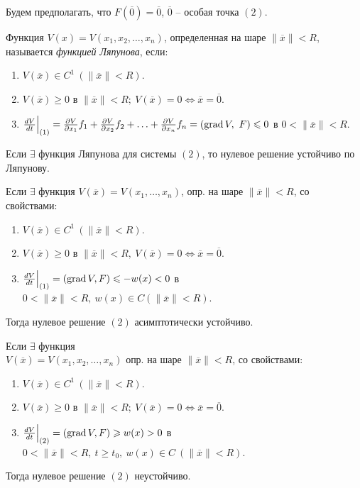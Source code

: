 Будем предполагать, что $F(\overline{0} ) = \overline{0} $, $\overline{0} $ -- особая точка $(2)$.

\begin{definition}
	Функция $V(x) = V(x_1,x_2,\ldots ,x_n)$, определенная на шаре $\|\overline{x} \| < R$, называется \emph{функцией Ляпунова}, если:
	\begin{enumerate}
		\item $V(\overline{x} ) \in C^1 \ (\|\overline{x} \| < R)$.
		\item $V(\overline{x} ) \geqslant 0$ в $\|\overline{x} \| < R ; \ V(\overline{x} ) = 0 \iff \overline{x} = \overline{0} $.
		\item $\frac{dV}{dt} \Big|_{(1)} = \frac{\partial V}{\partial x_1} f_1 + \frac{\partial V}{\partial x_2} f_2 + \ldots + \frac{\partial V}{\partial x_n} f_n = (\operatorname{grad} V, \ F) \leqslant 0$ в $0 < \|\overline{x} \| < R$.
	\end{enumerate}
\end{definition}

\begin{theorem}
	Если $\exists $ функция Ляпунова для системы $(2)$, то нулевое решение устойчиво по Ляпунову.
\end{theorem}

\begin{theorem}
	Если $\exists $ функция $V(\overline{x} ) = V(x_1,\ldots ,x_n)$, опр. на шаре $\|\overline{x} \| < R$, со свойствами:
	\begin{enumerate}
		\item $V(\overline{x} ) \in C^1 \ (\|\overline{x} \| < R)$.
		\item $V(\overline{x} )\geqslant 0$ в $\|\overline{x} \| < R, \ V(\overline{x} ) = 0 \iff \overline{x}  = \overline{0}  $.
		\item $\frac{dV}{dt} \Big|_{(1)} = (\operatorname{grad} V, F)\leqslant -w(x) < 0$ в $0 < \|\overline{x} \| < R, \ w(x) \in C(\|\overline{x} \| < R)$.
	\end{enumerate}

	Тогда нулевое решение $(2)$ асимптотически устойчиво.
\end{theorem}

\begin{theorem}
	Если $\exists $ функция \\ $V(\overline{x} ) = V(x_1,x_2,\ldots ,x_n)$ опр. на шаре $\|\overline{x} \| < R$, со свойствами:
	\begin{enumerate}
		\item $V(\overline{x} ) \in C^1 \ (\|\overline{x} \| < R)$.
		\item $V(\overline{x} ) \geqslant 0$ в $\|\overline{x} \| < R ; \ V(\overline{x} ) = 0 \iff \overline{x} = \overline{0} $.
		\item $\frac{dV}{dt} \Big|_{(2)} = (\operatorname{grad} V, F) \geqslant w(x)> 0$ в $0 < \| \overline{x} \| < R,\ t \geqslant t_0,\ w(x) \in C \ (\|\overline{x} \| < R)$.
	\end{enumerate}

	Тогда нулевое решение $(2)$ неустойчиво.
\end{theorem}

